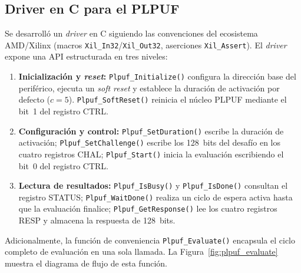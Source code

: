 \subsection{Driver en C para el PLPUF}
\label{sec:driver}

Se desarrolló un \textit{driver} en C siguiendo las convenciones del
ecosistema AMD/Xilinx (macros \texttt{Xil\_In32}/\texttt{Xil\_Out32},
aserciones \texttt{Xil\_Assert}). El \textit{driver} expone una API
estructurada en tres niveles:

\begin{enumerate}
  \item \textbf{Inicialización y \textit{reset}:}
    \texttt{Plpuf\_Initialize()} configura la dirección base del periférico,
    ejecuta un \textit{soft reset} y establece la duración de activación por
    defecto ($c = 5$). \texttt{Plpuf\_SoftReset()} reinicia el núcleo PLPUF
    mediante el bit~1 del registro CTRL.

  \item \textbf{Configuración y control:}
    \texttt{Plpuf\_SetDuration()} escribe la duración de activación;
    \texttt{Plpuf\_SetChallenge()} escribe los 128~bits del desafío en los
    cuatro registros CHAL; \texttt{Plpuf\_Start()} inicia la evaluación
    escribiendo el bit~0 del registro CTRL.

  \item \textbf{Lectura de resultados:}
    \texttt{Plpuf\_IsBusy()} y \texttt{Plpuf\_IsDone()} consultan el registro
    STATUS; \texttt{Plpuf\_WaitDone()} realiza un ciclo de espera activa hasta
    que la evaluación finalice; \texttt{Plpuf\_GetResponse()} lee los cuatro
    registros RESP y almacena la respuesta de 128~bits.
\end{enumerate}

Adicionalmente, la función de conveniencia \texttt{Plpuf\_Evaluate()} encapsula
el ciclo completo de evaluación en una sola llamada. La
Figura~\ref{fig:plpuf_evaluate} muestra el diagrama de flujo de esta función.

